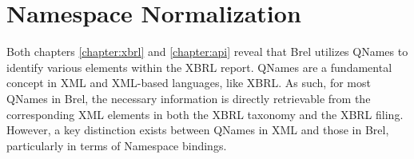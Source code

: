 
\section{Namespace Normalization}
\label{sec:qnames_implementation}





Both chapters \ref{chapter:xbrl} and \ref{chapter:api} reveal that Brel utilizes QNames to identify various elements within the XBRL report.
QNames are a fundamental concept in XML and XML-based languages, like XBRL.
As such, for most QNames in Brel, the necessary information is directly retrievable from the corresponding XML elements in both the XBRL taxonomy and the XBRL filing.
However, a key distinction exists between QNames in XML and those in Brel, particularly in terms of Namespace bindings.

